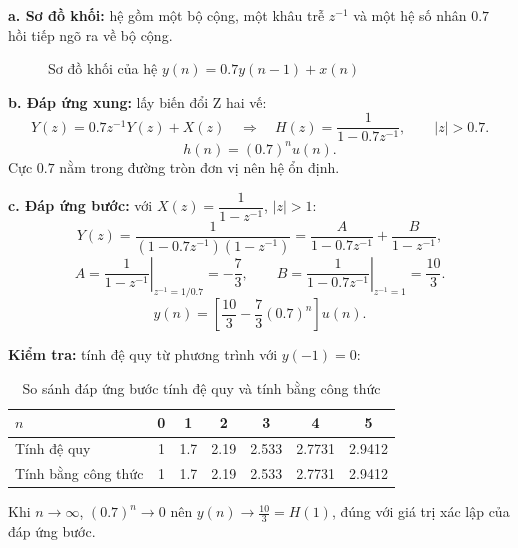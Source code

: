 \documentclass[12pt,a4paper]{article}
\begin{document}
\textbf{a. Sơ đồ khối:} hệ gồm một bộ cộng, một khâu trễ $z^{-1}$ và một hệ số nhân $0.7$ hồi tiếp ngõ ra về bộ cộng.
\begin{figure}[H]
    \centering
    \caption{Sơ đồ khối của hệ $y(n) = 0.7y(n-1) + x(n)$}
\end{figure}

\textbf{b. Đáp ứng xung:} lấy biến đổi Z hai vế:
\[
    Y(z) = 0.7 z^{-1} Y(z) + X(z)
    \quad\Longrightarrow\quad
    H(z) = \frac{1}{1 - 0.7z^{-1}}, \qquad |z| > 0.7.
\]
\begin{equation}
    h(n) = (0.7)^n u(n).
\end{equation}
Cực $0.7$ nằm trong đường tròn đơn vị nên hệ ổn định.

\textbf{c. Đáp ứng bước:} với $X(z) = \dfrac{1}{1 - z^{-1}}$, $|z| > 1$:
\[
    Y(z) = \frac{1}{(1 - 0.7z^{-1})(1 - z^{-1})} = \frac{A}{1 - 0.7z^{-1}} + \frac{B}{1 - z^{-1}},
\]
\[
    A = \left.\frac{1}{1 - z^{-1}}\right|_{z^{-1} = 1/0.7} = -\frac{7}{3},
    \qquad
    B = \left.\frac{1}{1 - 0.7z^{-1}}\right|_{z^{-1} = 1} = \frac{10}{3}.
\]
\begin{equation}
    y(n) = \left[\frac{10}{3} - \frac{7}{3}(0.7)^n\right] u(n).
\end{equation}

\textbf{Kiểm tra:} tính đệ quy từ phương trình với $y(-1) = 0$:
\begin{table}[H]
\centering
\begin{tabular}{l|cccccc}
\toprule
$n$ & 0 & 1 & 2 & 3 & 4 & 5 \\
\midrule
Tính đệ quy & 1 & 1.7 & 2.19 & 2.533 & 2.7731 & 2.9412 \\
Tính bằng công thức & 1 & 1.7 & 2.19 & 2.533 & 2.7731 & 2.9412 \\
\bottomrule
\end{tabular}
\caption{So sánh đáp ứng bước tính đệ quy và tính bằng công thức}
\end{table}
\noindent Khi $n \to \infty$, $(0.7)^n \to 0$ nên $y(n) \to \frac{10}{3} = H(1)$, đúng với giá trị xác lập của đáp ứng bước.
\end{document}
